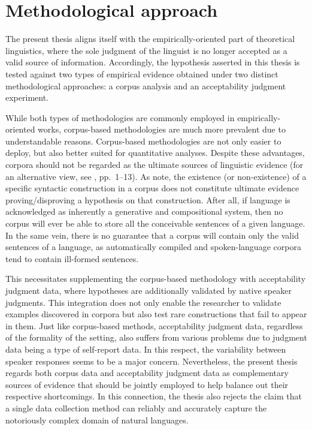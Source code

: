 \section{Methodological approach}

The present thesis aligns itself with the empirically-oriented part of theoretical linguistics, where the sole judgment of the linguist is no longer accepted as a valid source of information. Accordingly, the hypothesis asserted in this thesis is tested against two types of empirical evidence obtained under two distinct methodological approaches: a corpus analysis and an acceptability judgment experiment. 

\begin{sloppypar}
While both types of methodologies are commonly employed in \mbox{empirically-oriented} works, corpus-based methodologies are much more prevalent due to understandable reasons. Corpus-based methodologies are not only easier to deploy, but also better suited for quantitative analyses. Despite these advantages, corpora should not be regarded as the ultimate sources of linguistic evidence (for an alternative view, see \citealp{sampson-2002}, pp.\ 1--13). As \citet[p.\ 29]{sprouse_schutze_judgmentdata} note, the existence (or non-existence) of a specific syntactic construction in a corpus does not constitute ultimate evidence proving/disproving a hypothesis on that construction. After all, if language is acknowledged as inherently a generative and compositional system, then no corpus will ever be able to store all the conceivable sentences of a given language. In the same vein, there is no guarantee that a corpus will contain only the valid sentences of a language, as automatically compiled and spoken-language corpora tend to contain ill-formed sentences. 

This necessitates supplementing the corpus-based methodology with acceptability judgment data, where hypotheses are additionally validated by native speaker judgments. This integration does not only enable the researcher to validate examples discovered in corpora but also test rare constructions that fail to appear in them. Just like corpus-based methods, acceptability judgment data, regardless of the formality of the setting, also suffers from various problems due to judgment data being a type of self-report data. In this respect, the variability between speaker responses \citep[pp.\ 3--7]{cowart1997} seems to be a major concern. Nevertheless, the present thesis regards both corpus data and acceptability judgment data as complementary sources of evidence that should be jointly employed to help balance out their respective shortcomings. In this connection, the thesis also rejects the claim that a single data collection method can reliably and accurately capture the notoriously complex domain of natural languages.
\end{sloppypar}